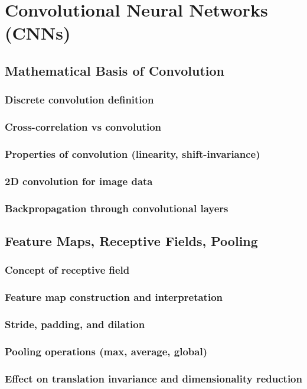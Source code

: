 ﻿\chapter{Convolutional Neural Networks (CNNs)}
\section{Mathematical Basis of Convolution}
\subsection{Discrete convolution definition}
\subsection{Cross-correlation vs convolution}
\subsection{Properties of convolution (linearity, shift-invariance)}
\subsection{2D convolution for image data}
\subsection{Backpropagation through convolutional layers}

\section{Feature Maps, Receptive Fields, Pooling}
\subsection{Concept of receptive field}
\subsection{Feature map construction and interpretation}
\subsection{Stride, padding, and dilation}
\subsection{Pooling operations (max, average, global)}
\subsection{Effect on translation invariance and dimensionality reduction}

